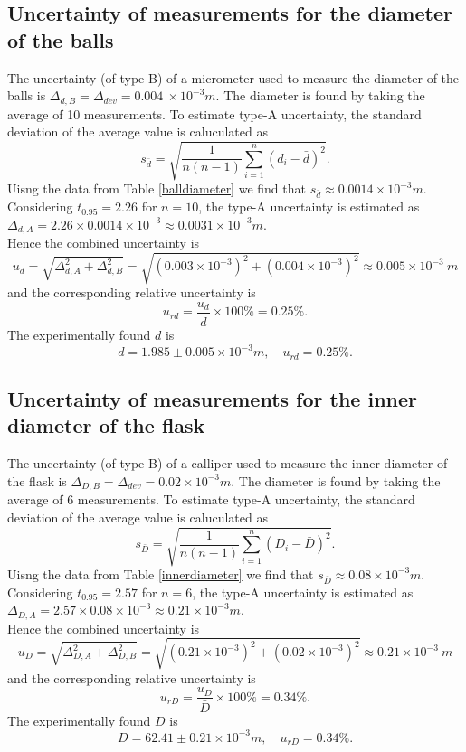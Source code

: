 \subsection{Uncertainty of measurements for the diameter of the balls}
    The uncertainty (of type-B) of a micrometer used to measure the diameter of the balls is $\Delta_{d,B}=\Delta_{dev}=0.004\ \times10^{-3}m$. The diameter is found by taking the average of 10 measurements. To estimate type-A uncertainty, the standard deviation of the average value is caluculated as
    \[
        s_{\bar{d}}=\sqrt{\frac{1}{n(n-1)}\sum_{i=1}^n(d_i-\bar{d})^2}.
    \]
    Uisng the data from Table \ref{balldiameter} we find that $s_{\bar{d}}\approx 0.0014\times10^{-3}m$. Considering $t_{0.95}=2.26$ for $n=10$, the type-A uncertainty is estimated as $\Delta_{d,A}=2.26\times0.0014\times10^{-3}\approx 0.0031\times10^{-3}m$.\\
    Hence the combined uncertainty is
    \[
        u_{d}=\sqrt{\Delta_{d,A}^2+\Delta_{d,B}^2}=\sqrt{(0.003\times10^{-3})^2+(0.004\times10^{-3})^2}\approx 0.005\times10^{-3}\ m
    \]
    and the corresponding relative uncertainty is 
    \[
        u_{rd}=\frac{u_d}{\bar{d}}\times 100\%=0.25\%.
    \]
    The experimentally found $d$ is 
    \[
        d=1.985\pm 0.005 \times10^{-3}m,\quad u_{rd}=0.25\%.
    \]

\subsection{Uncertainty of measurements for the inner diameter of the flask}
    The uncertainty (of type-B) of a calliper used to measure the inner diameter of the flask is $\Delta_{D,B}=\Delta_{dev}=0.02\times10^{-3}m$. The diameter is found by taking the average of 6 measurements. To estimate type-A uncertainty, the standard deviation of the average value is caluculated as
    \[
        s_{\bar{D}}=\sqrt{\frac{1}{n(n-1)}\sum_{i=1}^n(D_i-\bar{D})^2}.
    \]
    Uisng the data from Table \ref{innerdiameter} we find that $s_{\bar{D}}\approx 0.08\times10^{-3}m$. Considering $t_{0.95}=2.57$ for $n=6$, the type-A uncertainty is estimated as $\Delta_{D,A}=2.57\times0.08\times10^{-3}\approx 0.21\times10^{-3}m$.\\
    Hence the combined uncertainty is
    \[
        u_{D}=\sqrt{\Delta_{D,A}^2+\Delta_{D,B}^2}=\sqrt{(0.21\times10^{-3})^2+(0.02\times10^{-3})^2}\approx 0.21\times10^{-3}\ m
    \]
    and the corresponding relative uncertainty is 
    \[
        u_{rD}=\frac{u_D}{\bar{D}}\times 100\%=0.34\%.
    \]
    The experimentally found $D$ is 
    \[
        D=62.41\pm 0.21 \times10^{-3}m,\quad u_{rD}=0.34\%.
    \]

